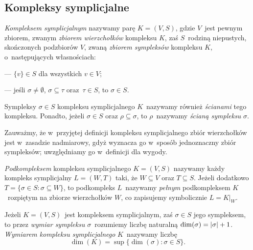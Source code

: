 \subsection{Kompleksy symplicjalne}
\textit{Kompleksem symplicjalnym} nazywamy parę $K=(V,S)$, gdzie $V$~jest pewnym zbiorem, zwanym \textit{zbiorem wierzchołków} kompleksu $K$, zaś $S$~rodziną niepustych, skończonych podzbiorów $V$, zwaną \textit{zbiorem sympleksów} kompleksu $K$, o~następujących własnościach:
\begin{compactitem}
\item[---] $\{v\}\in S$ dla wszystkich $v\in V$;
\item[---] jeśli $\sigma\not=\emptyset$, $\sigma\subseteq \tau$ oraz~$\tau\in S$, to $\sigma\in S$.
\end{compactitem}
Sympleksy $\sigma\in S$ kompleksu symplicjalnego $K$~nazywamy również \textit{ścianami} tego kompleksu. Ponadto, jeżeli $\sigma\in S$ oraz $\rho\subseteq \sigma$, to $\rho$~nazywamy \textit{ścianą sympleksu} $\sigma$.

Zauważmy, że w~przyjętej definicji kompleksu symplicjalnego zbiór wierzchołków jest w~zasadzie nadmiarowy, gdyż wyznacza go w~sposób jednoznaczny zbiór sympleksów; uwzględniamy go w~definicji dla wygody.

\textit{Podkompleksem} kompleksu symplicjalnego $K=(V,S)$ nazywamy każdy kompleks symplicjalny $L=(W,T)$ taki, że $W\subseteq V$ oraz $T\subseteq S$. Jeżeli dodatkowo $T=\{\sigma\in S:\sigma\subseteq W\}$, to podkompleks $L$~nazywamy \textit{pełnym} podkompleksem $K$~rozpiętym na zbiorze wierzchołków $W$, co zapisujemy symbolicznie $L=K\big|_W$.

Jeżeli $K=(V,S)$~jest kompleksem symplicjalnym, zaś $\sigma\in S$ jego sympleksem, to przez \textit{wymiar sympleksu} $\sigma$~rozumiemy liczbę naturalną $\dim(\sigma)=\left|\sigma\right|+1$. \textit{Wymiarem kompleksu symplicjalnego} $K$~nazywamy liczbę \[\dim(K)=\sup\{\dim(\sigma):\sigma\in S\}.\]

